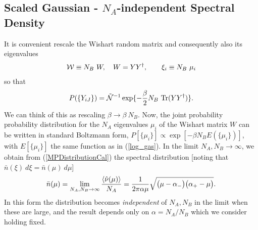 \documentclass[aps,prb,preprint,onecolumn,amsmath,amssymb,superscriptaddress,eqsecnum,floatfix,scrartcl]{revtex4-1}
\begin{document}
\subsection{Scaled Gaussian - $N_A$-independent Spectral Density}
\label{AppendixSubSectionScaledGaussian}



It is convenient rescale the Wishart random matrix and consequently also its eigenvalues 
\begin{eqnarray}
\label{RescaleW}
{\cal W} \equiv N_B  \ W,
\quad W=Y Y^\dagger,
\qquad \xi_i \equiv N_B \ \mu_i
\end{eqnarray}
so that
\begin{eqnarray}
\label{WishartGaussianDistributionNonCal}
 P(\{Y_{iJ}\})
=
{\cal{\tilde  N}}^{-1}
\exp  \{ - {\beta\over 2} N_B \ \mbox{Tr}(Y Y^\dagger) \}.
\end{eqnarray}
We can think of this as rescaling $\beta \to \beta \ N_B$.
Now, the joint probability probability  distribution for the $N_A$ eigenvalues  ${\mu}_i$ of  the Wishart matrix $W$  
 can be written in standard Boltzmann form, $P[\{\mu_i\}]\propto \exp[-\beta  N_B E(\{\mu_i\})]$, with
$E[\{\mu_i\}]$ the same function as 
 in (\ref{log_gas}).
In the limit $N_A, N_B \to \infty$, we obtain  from (\ref{MPDistributionCal})
the spectral distribution [noting that   $\bar{n}(\xi) \ d \xi = \bar{n}(\mu) \ d \mu$]
\begin{eqnarray}
\label{MarchenkoPasturDistributionNindependent}
\bar{n}(\mu)
= \lim_{N_A, N_B \to \infty}
{\langle {\hat \nu}(\mu)\rangle \over N_A}
={1\over 2 \pi \alpha \mu}
\sqrt{\bigl (
\mu -\alpha_- \bigr)
\bigl (\alpha_+ - \mu\bigr) }.
\end{eqnarray}
In this form the distribution becomes {\it independent} of $N_A, N_B$ in the limit when these are large, and the result depends only on $\alpha
=
N_A/N_B$ which we consider holding fixed.
\end{document}
